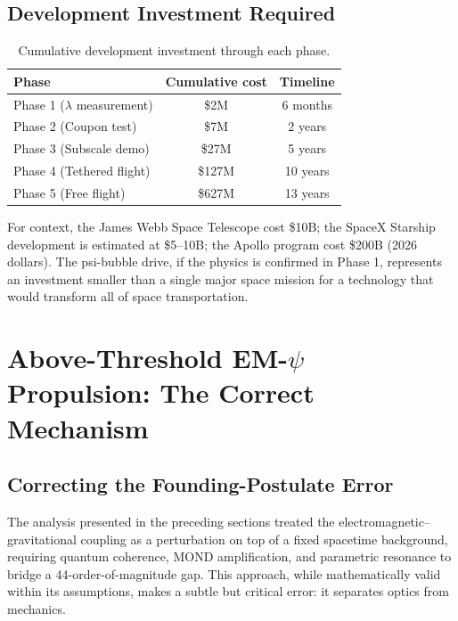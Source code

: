 \documentclass[twocolumn,prl,superscriptaddress,nofootinbib,longbibliography,floatfix]{revtex4-2}
\begin{document}
\subsection{Development Investment Required}

\begin{table}[h]
\centering
\caption{Cumulative development investment through each phase.}
\label{tab:investment}
\begin{ruledtabular}
\begin{tabular}{lcc}
Phase & Cumulative cost & Timeline \\
\hline
Phase 1 ($\lambda$ measurement) & \$2M & 6 months \\
Phase 2 (Coupon test) & \$7M & 2 years \\
Phase 3 (Subscale demo) & \$27M & 5 years \\
Phase 4 (Tethered flight) & \$127M & 10 years \\
Phase 5 (Free flight) & \$627M & 13 years \\
\end{tabular}
\end{ruledtabular}
\end{table}

For context, the James Webb Space Telescope cost \$10B; the SpaceX
Starship development is estimated at \$5--10B; the Apollo program cost
\$200B (2026 dollars).  The psi-bubble drive, if the physics is
confirmed in Phase 1, represents an investment smaller than a single
major space mission for a technology that would transform all of space
transportation.

\section{Above-Threshold EM-$\psi$ Propulsion: The Correct Mechanism}\label{sec:threshold}

\subsection{Correcting the Founding-Postulate Error}\label{ssec:postulate-error}

The analysis presented in the preceding sections treated the
electromagnetic--gravitational coupling as a perturbation on top of a
fixed spacetime background, requiring quantum coherence, MOND
amplification, and parametric resonance to bridge a 44-order-of-magnitude
gap.  This approach, while mathematically valid within its assumptions,
makes a subtle but critical error: it separates optics from mechanics.
\end{document}
